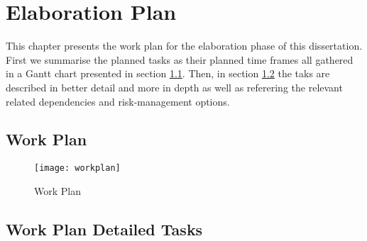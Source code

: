 \chapter{Elaboration Plan}
\label{cha:elaboration_plan}

This chapter presents the work plan for the elaboration phase of this dissertation. First we summarise the planned tasks as their planned time frames all gathered in a Gantt chart presented in section \ref{sec:workplan}. Then, in section \ref{sec:workplan_details} the taks are described in better detail and more in depth as well as referering the relevant related dependencies and risk-management options.

\section{Work Plan}
\label{sec:workplan}

\begin{figure}[htbp]
	\centerline{\texttt{[image: workplan]}}%
	\label{fig:workplan}
	\caption{Work Plan}
\end{figure}

\section{Work Plan Detailed Tasks}
\label{sec:workplan_details}